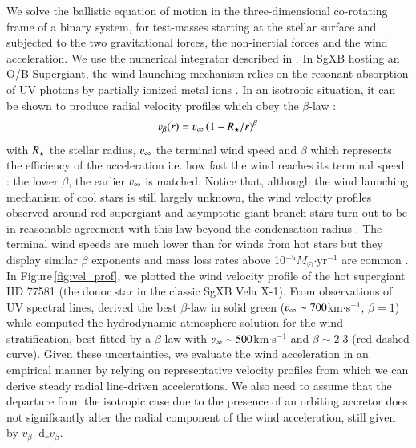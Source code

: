\documentclass[letter]{aa}
\makeatletter
\newcommand{\sgx}{SgXB\xspace}
\newcommand*{\ie}{i.e.\@\xspace}
\newcommand*\diff{\mathop{}\!\mathrm{d}}
\newcommand{\mystar}{{\fontfamily{lmr}\selectfont$\star$}}
\newcommand*{\msun}{$M_{\odot}$\@\xspace}
\makeatother
\begin{document}
We solve the ballistic equation of motion in the three-dimensional co-rotating frame of a binary system, for test-masses starting at the stellar surface and subjected to the two gravitational forces, the non-inertial forces and the wind acceleration. We use the numerical integrator described in \cite{ElMellah2016a}. In \sgx hosting an O/B Supergiant, the wind launching mechanism relies on the resonant absorption of UV photons by partially ionized metal ions \citep{Lucy1970,Castor1975}. In an isotropic situation, it can be shown to produce radial velocity profiles which obey the $\beta$-law :
\begin{equation}
\varv_{\beta}(r)=\varv_{\infty}\left(1-R_{\text{\mystar}}/r\right)^{\beta}
\end{equation}
with $R_{\text{\mystar}}$ the stellar radius, $\varv_{\infty}$ the terminal wind speed and $\beta$ which represents the efficiency of the acceleration \ie how fast the wind reaches its terminal speed : the lower $\beta$, the earlier $\varv_{\infty}$ is matched. Notice that, although the wind launching mechanism of cool stars is still largely unknown, the wind velocity profiles observed around red supergiant and asymptotic giant branch stars turn out to be in reasonable agreement with this law beyond the condensation radius \citep{Decin2006,Decin2010}. The terminal wind speeds are much lower than for winds from hot stars but they display similar $\beta$ exponents and mass loss rates above 10$^{-5}$\msun$\cdot$yr$^{-1}$ are common \citep{DeBeck2010}. In Figure\,\ref{fig:vel_prof}, we plotted the wind velocity profile of the hot supergiant HD 77581 (the donor star in the classic \sgx Vela X-1). From observations of UV spectral lines, \cite{Gimenez-Garcia2016} derived the best $\beta$-law in solid green ($\varv_{\infty}\sim 700$km$\cdot$s$^{-1}$, $\beta=1$) while \cite{Sander2017} computed the hydrodynamic atmosphere solution for the wind stratification, best-fitted by a $\beta$-law with $\varv_{\infty}\sim 500$km$\cdot$s$^{-1}$ and $\beta\sim 2.3$ (red dashed curve). Given these uncertainties, we evaluate the wind acceleration in an empirical manner by relying on representative velocity profiles from which we can derive steady radial line-driven accelerations. We also need to assume that the departure from the isotropic case due to the presence of an orbiting accretor does not significantly alter the radial component of the wind acceleration, still given by $v_{\beta}\diff_rv_{\beta}$. 
\end{document}
